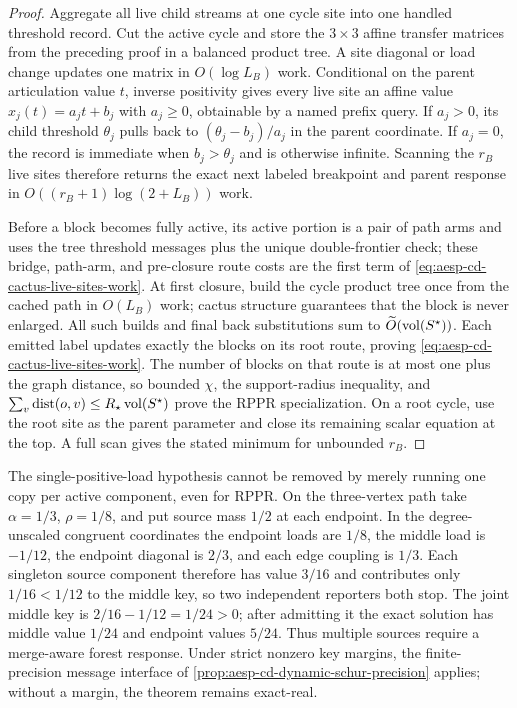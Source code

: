 \begin{proof}
Aggregate all live child streams at one cycle site into one handled threshold
record.  Cut the active cycle and store the $3\times3$ affine transfer
matrices from the preceding proof in a balanced product tree.  A site
diagonal or load change updates one matrix in $O(\log L_B)$ work.  Conditional
on the parent articulation value $t$, inverse positivity gives every live site
an affine value $x_j(t)=a_jt+b_j$ with $a_j\geq0$, obtainable by a named prefix
query.  If $a_j>0$, its child threshold $\theta_j$ pulls back to
$(\theta_j-b_j)/a_j$ in the parent coordinate.  If $a_j=0$, the record is
immediate when $b_j>\theta_j$ and is otherwise infinite.  Scanning the $r_B$
live sites therefore returns the exact next labeled breakpoint and parent
response in $O((r_B+1)\log(2+L_B))$ work.

Before a block becomes fully active, its active portion is a pair of path arms
and uses the tree threshold messages plus the unique double-frontier check;
these bridge, path-arm, and pre-closure route costs are the first term of
\cref{eq:aesp-cd-cactus-live-sites-work}.
At first closure, build the cycle product tree once from the cached path in
$O(L_B)$ work; cactus structure guarantees that the block is never enlarged.
All such builds and final back substitutions sum to
$\widetilde O(\operatorname{vol}(S^\star))$.  Each emitted label updates exactly the blocks
on its root route, proving \cref{eq:aesp-cd-cactus-live-sites-work}.  The number
of blocks on that route is at most one plus the graph distance, so bounded
$\chi$, the support-radius inequality, and
$\sum_v\operatorname{dist}(o,v)\leq R_\star\operatorname{vol}(S^\star)$ prove the RPPR
specialization.  On a root cycle, use the root site as the parent parameter
and close its remaining scalar equation at the top.  A full scan gives the
stated minimum for unbounded $r_B$.
\end{proof}

The single-positive-load hypothesis cannot be removed by merely running one
copy per active component, even for RPPR.  On the three-vertex path take
$\alpha=1/3$, $\rho=1/8$, and put source mass $1/2$ at each endpoint.  In
the degree-unscaled congruent coordinates the endpoint loads are $1/8$, the
middle load is $-1/12$,
the endpoint diagonal is $2/3$, and each edge coupling is $1/3$.  Each
singleton source component therefore has value $3/16$ and contributes only
$1/16<1/12$ to the middle key, so two independent reporters both stop.  The
joint middle key is $2/16-1/12=1/24>0$; after admitting it the exact solution
has middle value $1/24$ and endpoint values $5/24$.  Thus multiple sources
require a merge-aware forest response.
Under strict nonzero key margins, the finite-precision message
interface of \cref{prop:aesp-cd-dynamic-schur-precision} applies; without a
margin, the theorem remains exact-real.


